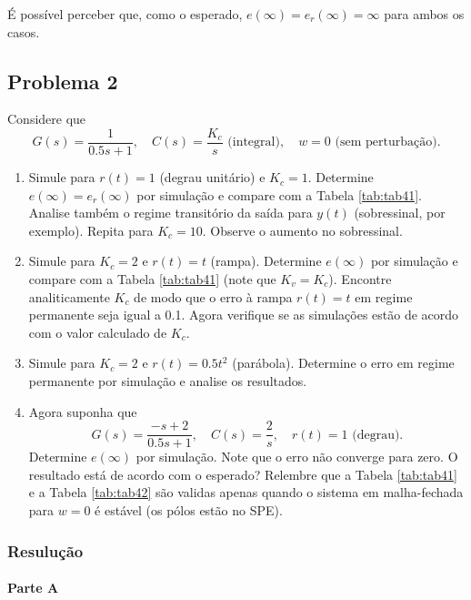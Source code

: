 \documentclass[
]{book}
\providecommand{\tightlist}{%
  \setlength{\itemsep}{0pt}\setlength{\parskip}{0pt}}
\begin{document}
É possível perceber que, como o esperado, \(e(\infty)= e_r(\infty) = \infty\) para ambos os casos.

\hypertarget{problema-2-2}{%
\subsection*{Problema 2}\label{problema-2-2}}

Considere que
\[
G(s) = \frac {1}{0.5s+1}, \quad C(s) = \frac{K_c}{s} \text{ (integral)}, \quad w=0 \text{ (sem perturbação).}
\]

\begin{enumerate}
\def\labelenumi{\alph{enumi}.}
\tightlist
\item
  Simule para \(r(t) = 1\) (degrau unitário) e \(K_c = 1\). Determine \(e(\infty) = e_r(\infty)\) por simulação e compare com a Tabela \ref{tab:tab41}. Analise também o regime transitório da saída para \(y(t)\) (sobressinal, por exemplo). Repita para \(K_c = 10\). Observe o aumento no sobressinal.
\item
  Simule para \(K_c = 2\) e \(r(t) = t\) (rampa). Determine \(e(\infty)\) por simulação e compare com a Tabela \ref{tab:tab41} (note que \(K_v = K_c\)). Encontre analiticamente \(K_c\) de modo que o erro à rampa \(r(t) = t\) em regime permanente seja igual a 0.1. Agora verifique se as simulações estão de acordo com o valor calculado de \(K_c\).
\item
  Simule para \(K_c = 2\) e \(r(t) = 0.5t^2\) (parábola). Determine o erro em regime permanente por simulação e analise os resultados.
\item
  Agora suponha que
  \[
  G(s) = \frac {-s+2}{0.5s+1}, \quad C(s)= \frac{2}{s}, \quad r(t) = 1 \text{ (degrau).}
  \]
  Determine \(e(\infty)\) por simulação. Note que o erro não converge para zero. O resultado está de acordo com o esperado? Relembre que a Tabela \ref{tab:tab41} e a Tabela \ref{tab:tab42} são validas apenas quando o sistema em malha-fechada para \(w=0\) é estável (os pólos estão no SPE).
\end{enumerate}

\hypertarget{resuluuxe7uxe3o}{%
\subsubsection*{Resulução}\label{resuluuxe7uxe3o}}

\hypertarget{parte-a-2}{%
\paragraph*{Parte A}\label{parte-a-2}}
\end{document}
